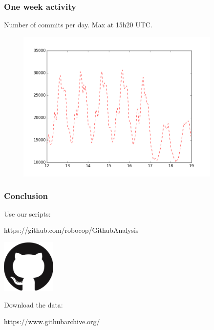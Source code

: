 \documentclass[12pt,t]{beamer}
\begin{document}
\begin{frame}
    \frametitle{One week activity}
        Number of commits per day.
        Max at 15h20 UTC.
        \begin{figure}
        \includegraphics[width=0.9\textwidth]{oneweekofactivity.png}
        \end{figure}
\end{frame}

\begin{frame}
    \frametitle{Conclusion}
    
    Use our scripts:
    \begin{center}
      https://github.com/robocop/GithubAnalysis
    \end{center}
   
    \begin{center}
        \includegraphics[width=0.2\textwidth]{octocat2.png}
    \end{center}

    Download the data:
    \begin{center}
      https://www.githubarchive.org/
    \end{center}

\end{frame}
\end{document}
